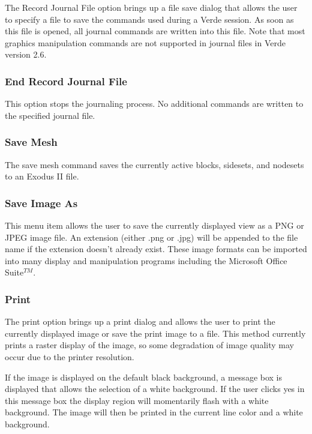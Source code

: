 \documentclass[10pt]{report}
\begin{document}
The Record Journal File option brings up a file save dialog that allows 
the user to specify a file to save the commands used during a Verde 
session.  As soon as this file is opened, all journal commands are 
written into this file.  Note that most graphics manipulation commands 
are not supported in journal files in Verde version 2.6.


\subsubsection{End Record Journal File}
\label{stop_journal}

This option stops the journaling process.  No additional commands are 
written to the specified journal file.

\subsubsection{Save Mesh}
\label{save_mesh}

The save mesh command saves the currently active blocks, sidesets, and
nodesets to an Exodus II file.

\subsubsection{Save Image As}
\label{save_image}

This menu item allows the user to save the currently displayed view as 
a PNG or JPEG image file.  An extension (either .png or .jpg) 
will be appended to the file name if 
the extension doesn't already exist.  These image formats can be imported 
into many display and manipulation programs including the Microsoft 
Office Suite$^{TM}$.


\subsubsection{Print}
\label{print}

The print option brings up a print dialog and 
allows the user to print the currently 
displayed image or save the print image to a file.  This method 
currently prints a raster display of the image, so some degradation of 
image quality may occur due to the printer resolution.  

If the image is displayed on the default black background, a message 
box is displayed that allows the selection of a white background.  If 
the user clicks yes in this message box the display region will 
momentarily flash with a white background.  The image will then be 
printed in the current line color and a white background.
\end{document}
